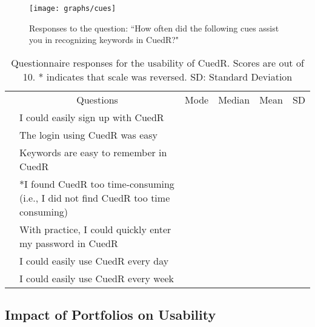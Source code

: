 \begin{figure}[t]
\centering
\texttt{[image: graphs/cues]}
\caption{Responses to the question: ``How often did the following cues assist you in recognizing keywords in CuedR?"}
\label{fig:cues}
\end{figure}


\begin{table*}[t]
\renewcommand{\arraystretch}{1.3}
\caption{Questionnaire responses for the usability of CuedR. Scores are
  out of 10. * indicates that scale was reversed. SD: Standard Deviation}  \centering
\vspace{0.2cm}
\begin{tabular}{c@{}m{8.5cm}rrrr@{}}
\hline
\hspace{0.2cm}&\multicolumn{1}{c}{Questions}&\multicolumn{1}{c}{Mode}&\multicolumn{1}{c}{Median}&\multicolumn{1}{c}{Mean}&\multicolumn{1}{c}{SD}\\ 
\cline{2-6}
& I could easily sign up with CuedR&\phantom{a}&\phantom{ab}&\phantom{a}&\phantom{m}\\
\cline{2-6}
& The login using CuedR was easy&\phantom{a}&\phantom{ab}&\phantom{a}&\phantom{m}\\ 
\cline{2-6}
& Keywords are easy to remember in CuedR &\phantom{a}&\phantom{ab}&\phantom{a}&\phantom{m}\\ 
\cline{2-6}
& *I found CuedR too time-consuming \newline (i.e., I did not find CuedR too time consuming) &\phantom{a}&\phantom{ab}&\phantom{a}&\phantom{m}\\
\cline{2-6}
& With practice, I could quickly enter my password in CuedR &\phantom{a}&\phantom{ab}&\phantom{a}&\phantom{m}\\
\cline{2-6}
& I could easily use CuedR every day&\phantom{a}&\phantom{ab}&\phantom{a}&\phantom{m}\\ 
\cline{2-6}
& I could easily use CuedR every week&\phantom{a}&\phantom{ab}&\phantom{a}&\phantom{m}\\ 
\hline
\end{tabular}
\label{tab:usability}
\end{table*}


\subsection{Impact of Portfolios on Usability}\label{im_portfolio}

